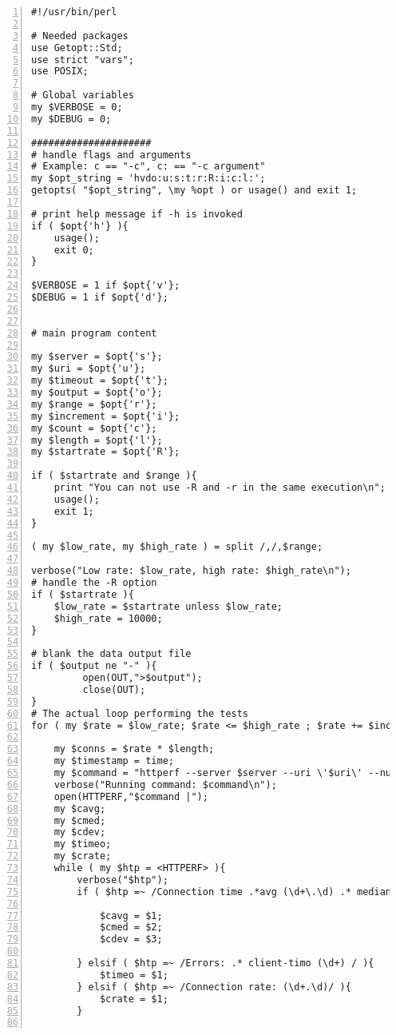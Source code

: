\begin{Verbatim}[numbers=left,label=The hammer.pl script]
#!/usr/bin/perl

# Needed packages
use Getopt::Std;
use strict "vars";
use POSIX;

# Global variables
my $VERBOSE = 0;
my $DEBUG = 0;

#####################
# handle flags and arguments
# Example: c == "-c", c: == "-c argument"
my $opt_string = 'hvdo:u:s:t:r:R:i:c:l:';
getopts( "$opt_string", \my %opt ) or usage() and exit 1;

# print help message if -h is invoked
if ( $opt{'h'} ){
    usage();
    exit 0;
}

$VERBOSE = 1 if $opt{'v'};
$DEBUG = 1 if $opt{'d'};


# main program content

my $server = $opt{'s'};
my $uri = $opt{'u'};
my $timeout = $opt{'t'};
my $output = $opt{'o'};
my $range = $opt{'r'};
my $increment = $opt{'i'};
my $count = $opt{'c'};
my $length = $opt{'l'};
my $startrate = $opt{'R'};

if ( $startrate and $range ){
    print "You can not use -R and -r in the same execution\n";
    usage();
    exit 1;
}

( my $low_rate, my $high_rate ) = split /,/,$range;

verbose("Low rate: $low_rate, high rate: $high_rate\n");
# handle the -R option
if ( $startrate ){
    $low_rate = $startrate unless $low_rate;
    $high_rate = 10000;
}

# blank the data output file
if ( $output ne "-" ){
         open(OUT,">$output");
         close(OUT);
}
# The actual loop performing the tests
for ( my $rate = $low_rate; $rate <= $high_rate ; $rate += $increment ){

    my $conns = $rate * $length;
    my $timestamp = time;
    my $command = "httperf --server $server --uri \'$uri\' --num-conn $conns --num-call $count --rate $rate --timeout $timeout";
    verbose("Running command: $command\n");
    open(HTTPERF,"$command |");
    my $cavg;
    my $cmed;
    my $cdev;
    my $timeo;
    my $crate;
    while ( my $htp = <HTTPERF> ){
        verbose("$htp");
        if ( $htp =~ /Connection time .*avg (\d+\.\d) .* median (\d+\.\d) stddev (\d+\.\d)/ ){

            $cavg = $1;
            $cmed = $2;
            $cdev = $3;

        } elsif ( $htp =~ /Errors: .* client-timo (\d+) / ){
            $timeo = $1;
        } elsif ( $htp =~ /Connection rate: (\d+.\d)/ ){
            $crate = $1;
        }


\end{Verbatim}
